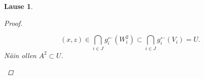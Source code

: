 \documentclass[12pt,a4paper,leqno]{report}
\theoremstyle{plain}
\newtheorem{lause}[equation]{Lause}
\theoremstyle{definition}
\theoremstyle{remark}
\begin{document}
\begin{lause}
\begin{proof}
\begin{enumerate}
\begin{equation*}
(x,z)\in \bigcap_{i\in J}g^{\leftarrow}_{i}(W_{i}^2)\subset  \bigcap_{i\in J}g^{\leftarrow}_{i}(V_{i})=U.
\end{equation*}
Näin ollen $A^2\subset U$.
%
%
%
%
%

\end{enumerate}
\end{proof}
\end{lause}
\end{document}
